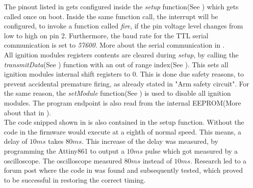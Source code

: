 \noindent The pinout listed in  gets configured inside the \textit{setup} function(See ) which gets called once on boot. Inside the same function call, the interrupt will be configured, to invoke a function called \textit{fire}, if the pin voltage level changes from low to high on pin 2.  Furthermore, the baud rate for the TTL serial communication is set to \textit{57600}. More about the serial communication in .\\



\noindent All ignition modules registers contents are cleared during \textit{setup}, by calling the \textit{transmitData}(See ) function with an out of range index(See ). This sets all ignition modules internal shift registers to 0. This is done due safety reasons, to prevent accidental premature firing, as already stated in  "Arm safety circuit". For the same reason, the \textit{setModule} function(See ) is used to disable all ignition modules. The program endpoint is also read from the internal EEPROM(More about that in ).\\



\noindent The code snipped shown in  is also contained in the setup function. Without the code in  the firmware would execute at a eighth of normal speed. This means, a delay of $10ms$ takes $80ms$. This increase of the delay was measured, by programming the Attiny861 to output a $10ms$ pulse which got measured by a oscilloscope. The oscilloscope measured $80ms$ instead of $10ms$. Research led to a forum post where the code in  was found and subsequently tested, which proved to be successful in restoring the correct timing.



